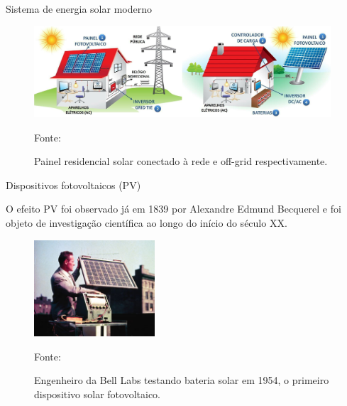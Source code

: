 \documentclass{beamer}
\begin{document}

\begin{frame}{Sistema de energia solar moderno}

\begin{figure}[ht]
    \centering
    \includegraphics[width=0.985\textwidth]{./Figuras/sistemas_pv.png}
    \caption{Painel residencial solar conectado à rede e off-grid respectivamente.}{Fonte: \cite{neosolar}}
   \label{fig:sistema_pv_rede}
\end{figure}

\end{frame}


\begin{frame}{Dispositivos fotovoltaicos (PV)}

O efeito PV foi observado já em 1839 por Alexandre Edmund Becquerel e foi objeto de investigação científica ao longo do início do século XX. 

\begin{figure}[ht]
    \centering
    \includegraphics[width=0.4\textwidth]{./Figuras/1954_solar2.jpg}
    \caption{Engenheiro da Bell Labs testando bateria solar em 1954, o primeiro dispositivo solar fotovoltaico.}{Fonte: \cite{belllabs_photovoltaics}}
   \label{fig:1954_solar2}
\end{figure}

\end{frame}

\end{document}
